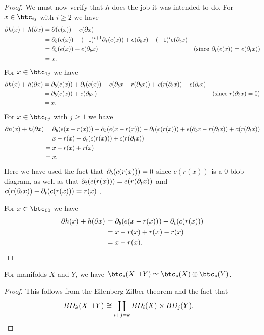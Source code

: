 \begin{proof}
We must now verify that $h$ does the job it was intended to do.
For $x\in \btc_{ij}$ with $i\ge 2$ we have
\begin{align*}
	\partial h(x) + h(\partial x) &= \partial(e(x)) + e(\partial x) && \\
			&= \partial_b(e(x)) + (-1)^{i+1} \partial_t(e(x)) + e(\partial_b x) + (-1)^i e(\partial_t x) && \\
			&= \partial_b(e(x)) + e(\partial_b x) && \text{(since $\partial_t(e(x)) = e(\partial_t x)$)} \\
		 	&= x . &&
\end{align*}
For $x\in \btc_{1j}$ we have
\begin{align*}
	\partial h(x) + h(\partial x) &= \partial_b(e(x)) + \partial_t(e(x)) + e(\partial_b x - r(\partial_b x)) + c(r(\partial_b x)) - e(\partial_t x) && \\
			&= \partial_b(e(x)) + e(\partial_b x) && \text{(since $r(\partial_b x) = 0$)} \\
			&= x . &&
\end{align*}
For $x\in \btc_{0j}$ with $j\ge 1$ we have
\begin{align*}
	\partial h(x) + h(\partial x) &= \partial_b(e(x - r(x))) - \partial_t(e(x - r(x))) - \partial_t(c(r(x))) + 
											e(\partial_t x - r(\partial_t x)) + c(r(\partial_t x)) \\
			&= x - r(x) - \partial_t(c(r(x))) + c(r(\partial_t x)) \\
			&= x - r(x) + r(x) \\
			&= x.
\end{align*}
Here we have used the fact that $\partial_b(c(r(x))) = 0$ since $c(r(x))$ is a $0$-blob diagram, 
as well as that $\partial_t(e(r(x))) = e(r(\partial_t x))$ 
and $c(r(\partial_t x)) - \partial_t(c(r(x))) = r(x)$ .

For $x\in \btc_{00}$ we have
\begin{align*}
	\partial h(x) + h(\partial x) &= \partial_b(e(x - r(x))) + \partial_t(c(r(x))) \\
			&= x - r(x) + r(x) - r(x)\\
			&= x - r(x). \qedhere
\end{align*}
\end{proof}

\begin{lemma} \label{btc-prod}
For manifolds $X$ and $Y$, we have $\btc_*(X\du Y) \simeq \btc_*(X)\otimes\btc_*(Y)$.
\end{lemma}
\begin{proof}
This follows from the Eilenberg-Zilber theorem and the fact that
\begin{align*}
	BD_k(X\sqcup Y) & \cong \coprod_{i+j=k} BD_i(X)\times BD_j(Y) . \qedhere
\end{align*}
\end{proof}

